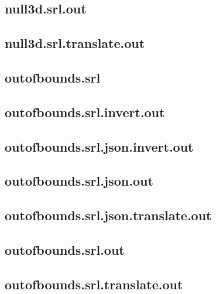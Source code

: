 \subsection{null3d.srl.out}
\label{app:null3d_srl.out}

\subsection{null3d.srl.translate.out}
\label{app:null3d_srl.translate.out}

\subsection{outofbounds.srl}
\label{app:outofbounds_srl}

\subsection{outofbounds.srl.invert.out}
\label{app:outofbounds_srl.invert.out}

\subsection{outofbounds.srl.json.invert.out}
\label{app:outofbounds_srl.json.invert.out}

\subsection{outofbounds.srl.json.out}
\label{app:outofbounds_srl.json.out}

\subsection{outofbounds.srl.json.translate.out}
\label{app:outofbounds_srl.json.translate.out}

\subsection{outofbounds.srl.out}
\label{app:outofbounds_srl.out}

\subsection{outofbounds.srl.translate.out}
\label{app:outofbounds_srl.translate.out}

